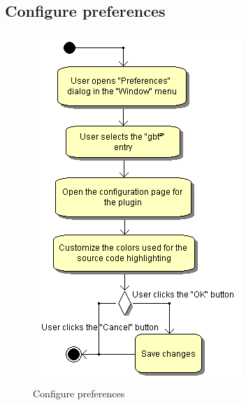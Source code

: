 \subsection{Configure preferences}
\begin{figure}[htb]
 \centering
 \includegraphics[height=0.7\textheight]{images/Activities/configure_preferences.png}
 \caption{Configure preferences}
 \label{ac_fg:preferences}
\end{figure}

\clearpage
